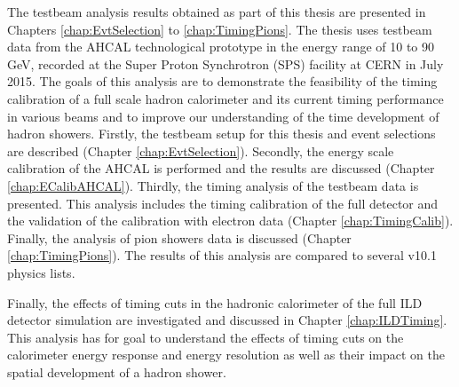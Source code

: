 The testbeam analysis results obtained as part of this thesis are presented in Chapters \ref{chap:EvtSelection} to \ref{chap:TimingPions}. The thesis uses testbeam data from the AHCAL technological prototype in the energy range of 10 to 90 GeV, recorded at the Super Proton Synchrotron (SPS) facility at CERN in July 2015. The goals of this analysis are to demonstrate the feasibility of the timing calibration of a full scale hadron calorimeter and its current timing performance in various beams and to improve our understanding of the time development of hadron showers. Firstly, the testbeam setup for this thesis and event selections are described (Chapter \ref{chap:EvtSelection}). Secondly, the energy scale calibration of the AHCAL is performed and the results are discussed (Chapter \ref{chap:ECalibAHCAL}). Thirdly, the timing analysis of the testbeam data is presented. This analysis includes the timing calibration of the full detector and the validation of the calibration with electron data (Chapter \ref{chap:TimingCalib}). Finally, the analysis of pion showers data is discussed (Chapter \ref{chap:TimingPions}). The results of this analysis are compared to several \geant v10.1 physics lists.

Finally, the effects of timing cuts in the hadronic calorimeter of the full ILD detector simulation are investigated and discussed in Chapter \ref{chap:ILDTiming}. This analysis has for goal to understand the effects of timing cuts on the calorimeter energy response and energy resolution as well as their impact on the spatial development of a hadron shower.
